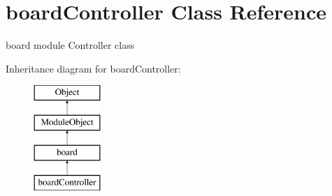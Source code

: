 \hypertarget{classboardController}{\section{board\+Controller Class Reference}
\label{classboardController}
}


board module Controller class  


Inheritance diagram for board\+Controller\+:\begin{figure}[H]
\begin{center}
\leavevmode
\includegraphics[height=4.000000cm]{classboardController}
\end{center}
\end{figure}
